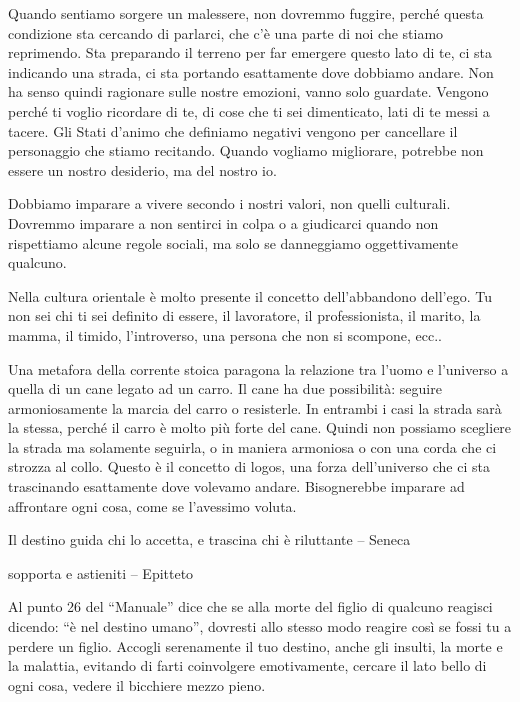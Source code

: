 \documentclass[12pt]{book} %
\begin{document}
Quando sentiamo sorgere un malessere, non dovremmo fuggire, perché questa condizione sta cercando di
parlarci, che c'è una parte di noi che stiamo reprimendo. Sta preparando il terreno per far emergere
questo lato di te, ci sta indicando una strada, ci sta portando esattamente dove dobbiamo andare. Non ha senso quindi
ragionare sulle nostre emozioni, vanno solo guardate. Vengono perché ti voglio ricordare di te, di cose che ti sei
dimenticato, lati di te messi a tacere. Gli Stati d'animo che definiamo negativi vengono per cancellare il personaggio
che stiamo recitando. Quando vogliamo migliorare, potrebbe non essere un nostro desiderio, ma del nostro io.

Dobbiamo imparare a vivere secondo i nostri valori, non
quelli culturali. Dovremmo imparare a non sentirci in colpa o a giudicarci quando non rispettiamo alcune regole
sociali, ma solo se danneggiamo oggettivamente qualcuno. 

Nella cultura orientale è molto presente il concetto dell'abbandono dell'ego.
Tu non sei chi ti sei definito di essere, il lavoratore, il professionista, il marito, la mamma, il timido,
l'introverso, una persona che non si scompone, ecc.. 

Una metafora della corrente stoica paragona la relazione tra
l'uomo e l'universo a quella di un cane legato ad un carro. Il cane ha due
possibilità: seguire armoniosamente la marcia del carro o resisterle. In entrambi i casi la strada sarà la stessa,
perché il carro è molto più forte del cane. Quindi non possiamo scegliere la strada ma solamente seguirla, o in maniera
armoniosa o con una corda che ci strozza al collo. Questo è il concetto di logos, una forza dell'universo che ci sta
trascinando esattamente dove volevamo andare. Bisognerebbe imparare ad affrontare ogni cosa, come se l'avessimo voluta.

Il destino guida chi lo accetta, e trascina chi è riluttante – Seneca

sopporta e astieniti – Epitteto

Al punto 26 del “Manuale” dice che se alla morte del figlio di qualcuno reagisci
dicendo: “è nel destino umano”, dovresti allo stesso modo reagire così se fossi tu a perdere un figlio. Accogli
serenamente il tuo destino, anche gli insulti, la morte e la malattia, evitando di farti coinvolgere emotivamente,
cercare il lato bello di ogni cosa, vedere il bicchiere mezzo pieno.
\end{document}
